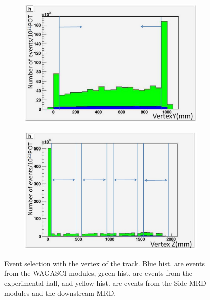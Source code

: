 \begin{figure}[tbh]
  \begin{center}
   \begin{subfigure}{0.48\textwidth}
     \includegraphics[width=\linewidth]{fig/fv_cut_y.pdf}
    \end{subfigure}
  \begin{subfigure}{0.48\textwidth}
      \includegraphics[width=\linewidth]{fig/fv_cut_z.pdf}
    \end{subfigure}    
    \end{center}
  \caption{Event selection with the vertex of the track.
Blue hist. are events from the WAGASCI modules, green hist. are events from the experimental hall, and yellow hist. are events from the Side-MRD modules and the downstream-MRD.
}
\label{fig:fv_cut}
\end{figure}


